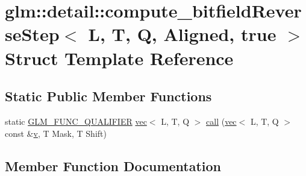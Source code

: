 \hypertarget{structglm_1_1detail_1_1compute__bitfield_reverse_step_3_01_l_00_01_t_00_01_q_00_01_aligned_00_01true_01_4}{}\section{glm\+:\+:detail\+:\+:compute\+\_\+bitfield\+Reverse\+Step$<$ L, T, Q, Aligned, true $>$ Struct Template Reference}
\label{structglm_1_1detail_1_1compute__bitfield_reverse_step_3_01_l_00_01_t_00_01_q_00_01_aligned_00_01true_01_4}
\subsection*{Static Public Member Functions}
\begin{DoxyCompactItemize}
\item 
static \mbox{\hyperlink{setup_8hpp_a33fdea6f91c5f834105f7415e2a64407}{G\+L\+M\+\_\+\+F\+U\+N\+C\+\_\+\+Q\+U\+A\+L\+I\+F\+I\+ER}} \mbox{\hyperlink{structglm_1_1vec}{vec}}$<$ L, T, Q $>$ \mbox{\hyperlink{structglm_1_1detail_1_1compute__bitfield_reverse_step_3_01_l_00_01_t_00_01_q_00_01_aligned_00_01true_01_4_aaa8d086197cfcab7e6e5b5fdb10224b9}{call}} (\mbox{\hyperlink{structglm_1_1vec}{vec}}$<$ L, T, Q $>$ const \&\mbox{\hyperlink{_s_d_l__opengl_8h_a10a82eabcb59d2fcd74acee063775f90}{v}}, T Mask, T Shift)
\end{DoxyCompactItemize}


\subsection{Member Function Documentation}
\mbox{\label{structglm_1_1detail_1_1compute__bitfield_reverse_step_3_01_l_00_01_t_00_01_q_00_01_aligned_00_01true_01_4_aaa8d086197cfcab7e6e5b5fdb10224b9}} 
